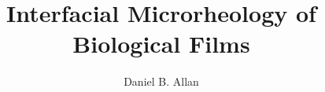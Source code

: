 \documentclass[12pt,oneside]{thesis}
\begin{document}
\title{Interfacial Microrheology of Biological Films}
\author{Daniel B. Allan}
\dissertation
\doctorphilosophy
\copyrightnotice



















\end{document}
